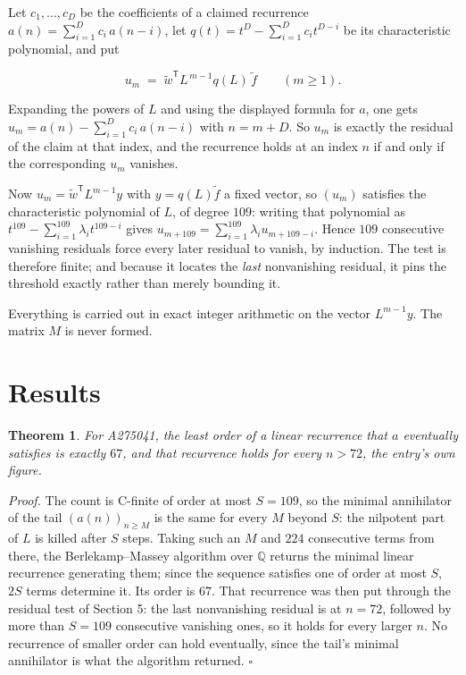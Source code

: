 \documentclass[11pt]{article}
\newtheorem{theorem}{Theorem}
\theoremstyle{definition}
\begin{document}
Let $c_1,\dots,c_D$ be the coefficients of a claimed recurrence $a(n) = \sum_{i=1}^{D} c_i\,a(n-i)$, let $q(t) = t^{D} - \sum_{i=1}^{D} c_i t^{D-i}$ be its characteristic polynomial, and put

\[u_m \;=\; \tilde w^{\mathsf T} L^{\,m-1} q(L)\,\tilde f \qquad (m \ge 1).\]

Expanding the powers of $L$ and using the displayed formula for $a$, one gets $u_m = a(n) - \sum_{i=1}^{D} c_i\,a(n-i)$ with $n = m + D$. So $u_m$ is exactly the residual of the claim at that index, and the recurrence holds at an index $n$ if and only if the corresponding $u_m$ vanishes.

Now $u_m = \tilde w^{\mathsf T} L^{m-1} y$ with $y = q(L)\tilde f$ a fixed vector, so $(u_m)$ satisfies the characteristic polynomial of $L$, of degree $109$: writing that polynomial as $t^{109} - \sum_{i=1}^{109} \lambda_i t^{109-i}$ gives $u_{m+109} = \sum_{i=1}^{109} \lambda_i u_{m+109-i}$. Hence $109$ consecutive vanishing residuals force every later residual to vanish, by induction. The test is therefore finite; and because it locates the {\itshape last} nonvanishing residual, it pins the threshold exactly rather than merely bounding it.

Everything is carried out in exact integer arithmetic on the vector $L^{m-1}y$. The matrix $M$ is never formed.

\section{Results}

\begin{theorem} For A275041, the least order of a linear recurrence that $a$ eventually satisfies is exactly $67$, and that recurrence holds for every $n > 72$, the entry's own figure.\end{theorem}

{\itshape Proof.} The count is C-finite of order at most $S = 109$, so the minimal annihilator of the tail $(a(n))_{n \ge M}$ is the same for every $M$ beyond $S$: the nilpotent part of $L$ is killed after $S$ steps. Taking such an $M$ and $224$ consecutive terms from there, the Berlekamp--Massey algorithm over $\mathbb{Q}$ returns the minimal linear recurrence generating them; since the sequence satisfies one of order at most $S$, $2S$ terms determine it. Its order is $67$. That recurrence was then put through the residual test of Section 5: the last nonvanishing residual is at $n = 72$, followed by more than $S = 109$ consecutive vanishing ones, so it holds for every larger $n$. No recurrence of smaller order can hold eventually, since the tail's minimal annihilator is what the algorithm returned. $\square$
\end{document}
